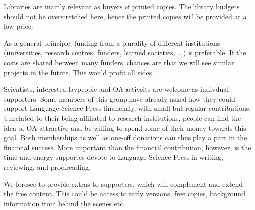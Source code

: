 \documentclass[nonflat,smallfont
]{langsci/langscibook}
\begin{document}
{Libraries are mainly relevant as buyers of printed copies. The library budgets should not be overstretched here, hence the printed copies will be provided at a low price. 

As a general principle, funding from a plurality of different institutions (universities, research centres, funders, learned societies, ...) is preferable. If the costs are shared between many funders, chances are that we will see similar projects in the future. This would profit all sides.

Scientists, interested laypeople and OA activsits are welcome as indivdual supporters. Some members of this group have already asked how they could support Language Science Press financially, with small but regular contributions. Unrelated to their being affiliated to research institutions, people can find the idea of OA attractive and be willing to spend some of their money towards this goal. Both memberships as well as one-off donations can thus play a part in the financial success. More important than the financial contribution, however, is the time and energy supportes devote to Language Science Press in writing, reviewing, and proofreading.

We foresee to provide extras to supporters, which will complement and extend the free content. This could be access to early versions, free copies, background information from behind the scenes etc. 
}
\end{document}
